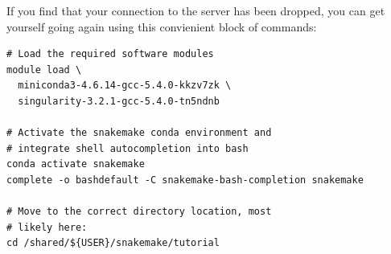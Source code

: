 If you find that your connection to the server has been dropped, you can get yourself going again using this convienient block of commands:

\begin{lstlisting}
# Load the required software modules
module load \
  miniconda3-4.6.14-gcc-5.4.0-kkzv7zk \
  singularity-3.2.1-gcc-5.4.0-tn5ndnb

# Activate the snakemake conda environment and
# integrate shell autocompletion into bash
conda activate snakemake
complete -o bashdefault -C snakemake-bash-completion snakemake

# Move to the correct directory location, most
# likely here:
cd /shared/${USER}/snakemake/tutorial
\end{lstlisting}
